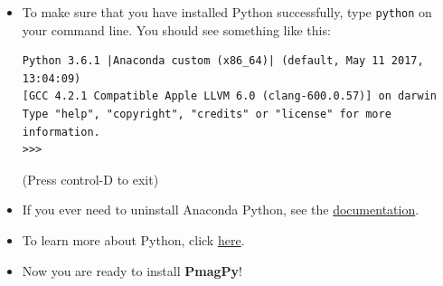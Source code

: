 \documentclass[11pt]{book}
\begin{document}
{\begin{itemize}
\begin{itemize}
   \item To make sure that you have installed Python successfully, type \texttt{python} on your command line.  You should see something like this: \begin{verbatim}
Python 3.6.1 |Anaconda custom (x86_64)| (default, May 11 2017, 13:04:09)
[GCC 4.2.1 Compatible Apple LLVM 6.0 (clang-600.0.57)] on darwin
Type "help", "copyright", "credits" or "license" for more information.
>>>\end{verbatim}
(Press control-D to exit)

  \item If you ever need to uninstall Anaconda Python, see the \href{https://docs.anaconda.com/anaconda/install/uninstall}{documentation}.

\item To learn more about Python, click \href{#Python}{here}.


  \item Now you are ready to install {\bf PmagPy}!


\end{itemize}
\end{itemize}}
\end{document}
